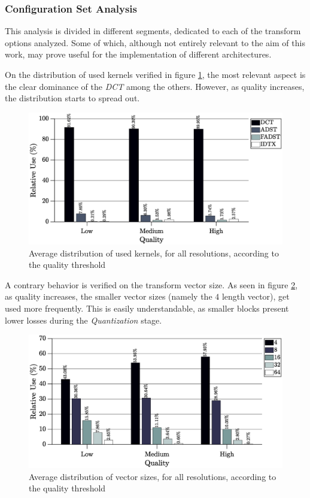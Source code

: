 \subsubsection{Configuration Set Analysis}

This analysis is divided in different segments, dedicated to each of the transform options analyzed. Some of which, although not entirely relevant to the aim of this work, may prove useful for the implementation of different architectures.

On the distribution of used kernels verified in figure \ref{fig:kernelavg}, the most relevant aspect is the clear dominance of the \emph{DCT} among the others. However, as quality increases, the distribution starts to spread out.

\begin{figure}[!htpb]
    \centering
    \includegraphics[width=\textwidth]{Sections/3Transforms/Images/kernelAvg.eps}
    \caption{Average distribution of used kernels, for all resolutions, according to the quality threshold}
    \label{fig:kernelavg}
\end{figure}

A contrary behavior is verified on the transform vector size. As seen in figure \ref{fig:sizeavg}, as quality increases, the smaller vector sizes (namely the $4$ length vector), get used more frequently. This is easily understandable, as smaller blocks present lower losses during the \emph{Quantization} stage. 

\begin{figure}[!htpb]
    \centering
    \includegraphics[width=\textwidth]{Sections/3Transforms/Images/vectSizAvg.eps}
    \caption{Average distribution of vector sizes, for all resolutions, according to the quality threshold}
    \label{fig:sizeavg}
\end{figure}

